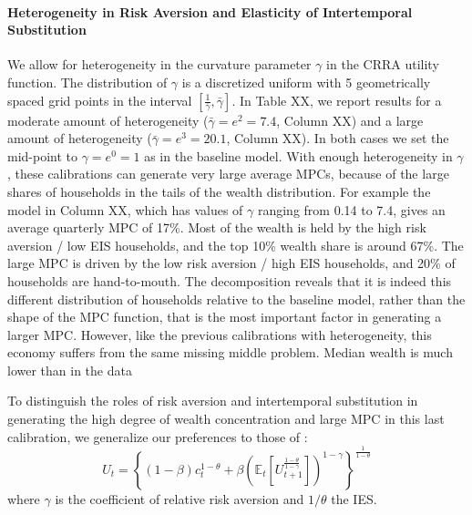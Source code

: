 \paragraph{Heterogeneity in Risk Aversion and Elasticity of Intertemporal Substitution}
\label{sec:one_asset_ies}

We allow for heterogeneity in the curvature parameter $\gamma$ in the CRRA utility function. The distribution of $\gamma $ is a discretized uniform with 5 geometrically spaced grid points in the interval $[\frac{1}{\bar{\gamma}},\bar{\gamma}]$. In Table XX, we report results for a moderate amount of heterogeneity ($\bar{\gamma} = e^{2}= 7.4$, Column XX) and a large amount of heterogeneity ($\bar{\gamma} = e^{3}=20.1$, Column XX). In both cases we set the mid-point to $\gamma =e^{0}=1$ as in the baseline model. With enough heterogeneity in $\gamma$, these calibrations can generate very large average MPCs, because of the large shares of households in the tails of the wealth distribution. For example the model in Column XX, which has values of $\gamma$ ranging from 0.14 to 7.4, gives an average quarterly MPC of 17\%. Most of the wealth is held by the high risk aversion / low EIS households, and the top 10\% wealth share is around 67\%. The large MPC is driven by the low risk aversion / high EIS households, and 20\% of households are hand-to-mouth. The decomposition reveals that it is indeed this different distribution of households relative to the baseline model, rather than the shape of the MPC function, that is the most important factor in generating a larger MPC. However, like the previous calibrations with heterogeneity, this economy suffers from the same missing middle problem. Median wealth is much lower than in the data 

To distinguish the roles of risk aversion and intertemporal substitution in generating the high degree of wealth concentration and large MPC in this last calibration, we generalize our preferences to those of \citet{epsteinzin}:
\begin{equation}
U_{t}=\left\{ \left( 1-\beta \right) c_{t}^{1-\theta }+\beta \left( \mathbb{E%
}_{t}\left[ U_{t+1}^{\frac{1-\theta }{1-\gamma }}\right] \right) ^{1-\gamma
}\right\} ^{\frac{1}{1-\theta }} \label{eq:EZ_utility}
\end{equation}%
where $\gamma $ is the coefficient of relative risk aversion and $1/\theta $ the IES. 


